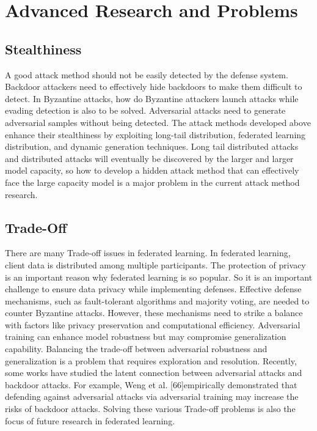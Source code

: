 \section{Advanced Research and Problems}
\subsection{Stealthiness}

A good attack method should not be easily detected by
the defense system. Backdoor attackers need to effectively
hide backdoors to make them diﬀicult to detect. In
Byzantine attacks, how do Byzantine attackers launch
attacks while evading detection is also to be solved.
Adversarial attacks need to generate adversarial samples
without being detected. The attack methods developed
above enhance their stealthiness by exploiting long-tail
distribution, federated learning distribution, and dynamic
generation techniques. Long tail distributed attacks and
distributed attacks will eventually be discovered by the
larger and larger model capacity, so how to develop a
hidden attack method that can effectively face the large
capacity model is a major problem in the current attack
method research.   

\subsection{Trade-Off}
There are many Trade-off issues in federated learning.
In federated learning, client data is distributed among
multiple participants. The protection of privacy is an
important reason why federated learning is so popular.
So it is an important challenge to ensure data privacy
while implementing defenses. Effective defense
mechanisms, such as fault-tolerant algorithms and majority
voting, are needed to counter Byzantine attacks. However,
these mechanisms need to strike a balance with factors
like privacy preservation and computational eﬀiciency.
Adversarial training can enhance model robustness but
may compromise generalization capability. Balancing the
trade-off between adversarial robustness and
generalization is a problem that requires exploration and resolution.
Recently, some works have studied the latent connection
between adversarial attacks and backdoor attacks. For
example, Weng et al. [66]empirically demonstrated that
defending against adversarial attacks via adversarial
training may increase the risks of backdoor attacks. Solving
these various Trade-off problems is also the focus of future
research in federated learning.

